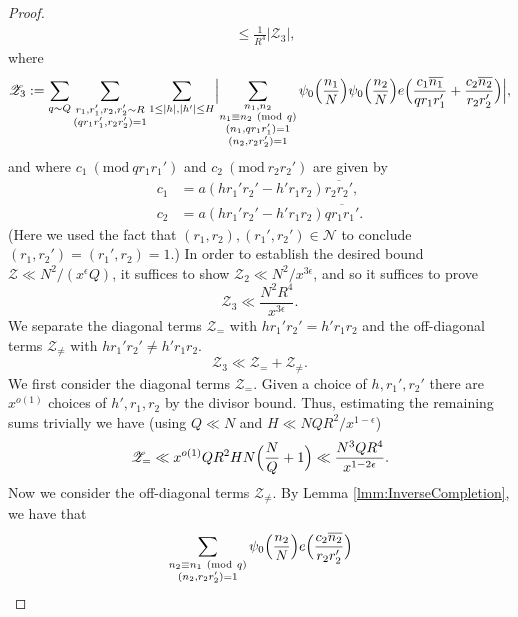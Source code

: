 \documentclass[10pt]{amsart}
\theoremstyle{plain}
\numberwithin{equation}{section}
\newcommand{\Mod}[1]{\ (\mathrm{mod}\ #1)}
\begin{document}
\begin{proof}
\begin{align*}
&\le \frac{1}{R^4}|\mathscr{Z}_3|,
\end{align*}
where
\begin{align*}
\mathscr{Z}_3:=\sum_{q\sim Q}\sum_{\substack{r_1,r_1',r_2,r_2'\sim R\\ (qr_1r_1',r_2r_2')=1}}\sum_{1\le |h|,|h'|\le H}\Bigl|\sum_{\substack{n_1,n_2\\ n_1\equiv n_2\Mod{q} \\ (n_1,qr_1r_1')=1\\ (n_2,r_2r_2')=1}}\psi_0\Bigl(\frac{n_1}{N}\Bigr)\psi_0\Bigl(\frac{n_2}{N}\Bigr)e\Bigl(\frac{c_1\overline{n_1}}{q r_1r_1'}+\frac{c_2\overline{n_2}}{r_2 r_2'}\Bigr)\Bigr|,
\end{align*}
and where $c_1\Mod{q r_1r_1'}$ and $c_2\Mod{r_2r_2'}$ are given by
\begin{align*}
c_1&=a(h r_1'r_2'-h' r_1r_2)\overline{r_2r_2'},\\
c_2&=a (h r_1'r_2'-h' r_1r_2)\overline{q r_1r_1'}.
\end{align*}
(Here we used the fact that $(r_1,r_2),(r_1',r_2')\in\mathcal{N}$ to conclude $(r_1,r_2')=(r_1',r_2)=1$.) In order to establish the desired bound $\mathscr{Z}\ll N^2/(x^\epsilon Q)$, it suffices to show $\mathscr{Z}_2\ll N^2/x^{3\epsilon}$, and so it suffices to prove
\begin{equation}
\mathscr{Z}_3\ll \frac{N^2 R^4}{x^{3\epsilon}}.\label{eq:ZhangE4}
\end{equation}
We separate the diagonal terms $\mathscr{Z}_{=}$ with $hr_1'r_2'=h'r_1r_2$ and the off-diagonal terms $\mathscr{Z}_{\ne}$ with $h r_1'r_2'\ne h'r_1r_2$.
\begin{equation}
\mathscr{Z}_3\ll \mathscr{Z}_{=}+\mathscr{Z}_{\ne}.
\label{eq:Z3Bound}
\end{equation}
We first consider the diagonal terms $\mathscr{Z}_{=}$. Given a choice of $h,r_1',r_2'$ there are $x^{o(1)}$ choices of $h',r_1,r_2$ by the divisor bound. Thus, estimating the remaining sums trivially we have (using $Q\ll N$ and $H\ll NQR^2/x^{1-\epsilon}$)
\begin{equation}
\mathscr{Z}_{=}\ll x^{o(1)} Q R^2 H N \Bigl(\frac{N}{Q}+1\Bigr)\ll \frac{N^3 Q R^4}{x^{1-2\epsilon}}.
\label{eq:ZEq}
\end{equation}
Now we consider the off-diagonal terms $\mathscr{Z}_{\ne}$. By Lemma \ref{lmm:InverseCompletion}, we have that
\begin{align*}
&\sum_{\substack{n_2\equiv n_1\Mod{q}\\ (n_2,r_2r_2')=1}}\psi_0\Bigl(\frac{n_2}{N}\Bigr)e\Bigl(\frac{c_2\overline{n_2}}{r_2 r_2'}\Bigr)\\

\end{align*}
\end{proof}
\end{document}
